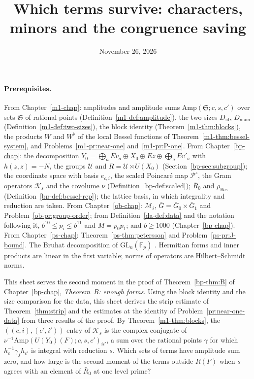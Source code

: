 \documentclass[reqno]{amsart}
\title{Which terms survive: characters, minors and the congruence saving}
\author{}
\date{November 26, 2026}
\newcounter{chap}
\theoremstyle{definition}
\theoremstyle{plain}
\theoremstyle{remark}
\newcommand{\F}{{\mathbb{F}}}
\newcommand{\Uc}{{\mathcal{U}}}
\newcommand{\Kc}{\mathcal K}
\newcommand{\Pc}{\mathcal P}
\newcommand{\cMc}{\mathcal M}
\newcommand{\Gb}{\bar G}
\newcommand{\Rb}{\bar R_0}
\newcommand{\Sf}{\mathfrak S}
\newcommand{\rB}{\rho_{\mathrm{Bes}}}
\newcommand{\Amp}{\mathrm{Amp}}
\newcommand{\Did}{D_{\mathrm{id}}}
\newcommand{\Dmain}{D_{\mathrm{main}}}
\newcommand{\GL}{\mathrm{GL}}
\begin{document}
\maketitle
{}\label{chap}

\paragraph{Prerequisites.}
From Chapter~\ref{m1-chap}: amplitudes and amplitude sums \(\Amp(\Sf;c,s,c')\) over sets \(\Sf\) of rational points (Definition~\ref{m1-def:amplitude}), the two sizes \(\Did\), \(\Dmain\) (Definition~\ref{m1-def:two-sizes}), the block identity (Theorem~\ref{m1-thm:blocks}), the products \(W\) and \(W^\flat\) of the local Bessel functions of Theorem~\ref{m1-thm:bessel-system}, and Problems~\ref{m1-pr:near-one} and~\ref{m1-pr:P-one}.  From Chapter~\ref{bp-chap}: the decomposition \(Y_0=\bigoplus_aEv_a\oplus X_0\oplus Ez\oplus\bigoplus_aEv'_a\) with \(h(z,z)=-N\), the groups \(\Uc\) and \(R=\Uc\rtimes U(X_0)\) (Section~\ref{bp-sec:subgroup}); the coordinate space with basis \(e_{c,i}\), the scaled Poincar\'e map \(\Pc^\circ\), the Gram operators \(\Kc_s\) and the covolume \(\nu\) (Definition~\ref{bp-def:scaled}); \(\Rb\) and \(\rB\) (Definition~\ref{bp-def:bessel-rep}); the lattice basis, in which integrality and reduction are taken.  From Chapter~\ref{ob-chap}: \(\cMc_i\), \(\Gb=\Gb_0\times\Gb_1\) and Problem~\ref{ob-pr:group-order}; from Definition~\ref{da-def:data} and the notation following it, \(b^{10}\le p_i\le b^{11}\) and \(M=p_0p_1\); and \(b\ge1000\) (Chapter~\ref{bp-chap}).  From Chapter~\ref{ps-chap}: Theorem~\ref{ps-thm:petersson} and Problem~\ref{ps-pr:J-bound}.  The Bruhat decomposition of \(\GL_n(\F_p)\) \cite[\S8.2]{Ca72}.  Hermitian forms and inner products are linear in the first variable; norms of operators are Hilbert--Schmidt norms.

\medskip
This sheet serves the second moment in the proof of Theorem~\ref{bp-thm:B} of Chapter~\ref{bp-chap}, \emph{Theorem~B: enough forms}.  Using the block identity and the size comparison for the data, this sheet derives the strip estimate of Theorem~\ref{thm:strip} and the estimates at the identity of Problem~\ref{pr:near-one-data} from three results of the proof.  By Theorem~\ref{m1-thm:blocks}, the \(((c,i),(c',i'))\) entry of \(\Kc_s\) is the complex conjugate of \(\nu^{-1}\Amp(U(Y_0)(F);c,s,c')_{ii'}\), a sum over the rational points \(\gamma\) for which \(h_c^{-1}\gamma_fh_{c'}\) is integral with reduction \(s\).  Which sets of terms have amplitude sum zero, and how large is the second moment of the terms outside \(R(F)\) when \(s\) agrees with an element of \(\Rb\) at one level prime?
\end{document}
